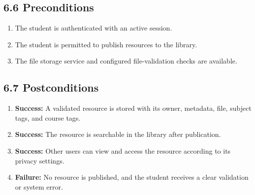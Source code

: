 \documentclass[12pt]{article}
\begin{document}
\subsection*{6.6 Preconditions}
\par\medskip
\begin{enumerate}
\item The student is authenticated with an active session.
\item The student is permitted to publish resources to the library.
\item The file storage service and configured file-validation checks are available.
\end{enumerate}
\par\medskip
\hypertarget{sec:6-7-postconditions}{}
\subsection*{6.7 Postconditions}
\par\medskip
\begin{enumerate}
\item \textbf{Success:} A validated resource is stored with its owner, metadata, file, subject tags, and course tags.
\item \textbf{Success:} The resource is searchable in the library after publication.
\item \textbf{Success:} Other users can view and access the resource according to its privacy settings.
\item \textbf{Failure:} No resource is published, and the student receives a clear validation or system error.
\end{enumerate}
\par\medskip
\hypertarget{sec:6-8-extension-points}{}
\end{document}

